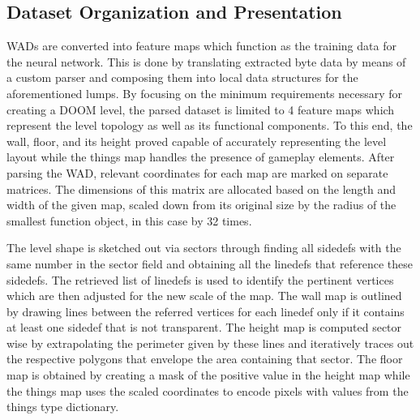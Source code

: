 \documentclass{Configuration_Files/PoliMi3i_thesis}
\begin{document}
\subsection{Dataset Organization and Presentation}
WADs are converted into feature maps which function as the training data for the 
neural network. This is done by translating extracted byte data by means of a custom 
parser and composing them into local data structures for the aforementioned lumps. 
By focusing on the minimum requirements necessary for creating a DOOM level, the 
parsed dataset is limited to 4 feature maps which represent the level topology as well 
as its functional components. To this end, the wall, floor, and its height proved
capable of accurately representing the level layout while the things map handles the 
presence of gameplay elements. After parsing the WAD, relevant coordinates
for each map are marked on separate matrices. The dimensions of this matrix are 
allocated based on the length and width of the given map, scaled down from its 
original size by the radius of the smallest function object, in this case by 32 times. 

The level shape is sketched out via sectors through finding all sidedefs with the same
number in the sector field and obtaining all the linedefs that reference these sidedefs. 
The retrieved list of linedefs is used to identify the pertinent vertices which are then 
adjusted for the new scale of the map. The wall map is outlined by drawing lines 
between the referred vertices for each linedef only if it contains at least one sidedef 
that is not transparent. The height map is computed sector wise by extrapolating the 
perimeter given by these lines and iteratively traces out the respective polygons that 
envelope the area containing that sector. The floor map is obtained by creating a 
mask of the positive value in the height map while the things map uses the scaled 
coordinates to encode pixels with values from the things type dictionary. 
\end{document}
